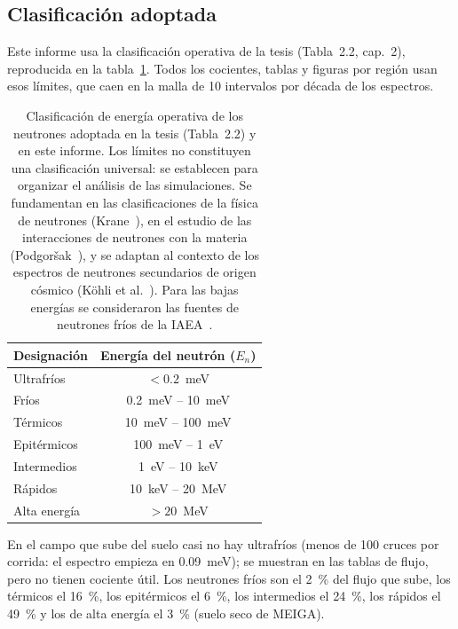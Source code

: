 \documentclass[11pt,a4paper]{article}
\begin{document}
\subsection{Clasificación adoptada}
Este informe usa la clasificación operativa de la tesis (Tabla~2.2, cap.~2), reproducida en la tabla~\ref{tab:clasif}.
Todos los cocientes, tablas y figuras por región usan esos límites, que caen en la malla de 10 intervalos por década de
los espectros.

\begin{table}[H]
	\centering\small
	\caption{Clasificación de energía operativa de los neutrones adoptada en la tesis (Tabla~2.2) y en este informe. Los
		límites no constituyen una clasificación universal: se establecen para organizar el análisis de las simulaciones. Se
		fundamentan en las clasificaciones de la física de neutrones (Krane~\cite[cap.~12, ``Neutron Physics'',
		pp.~444--477]{Krane1988}), en el estudio de las interacciones de neutrones con la materia
		(Podgoršak~\cite[cap.~9, ``Interactions of Neutrons with Matter'', pp.~429--449]{Podgorsak2010}), y se adaptan al
		contexto de los espectros de neutrones secundarios de origen cósmico (Köhli et al.~\cite[sec.~2.2, pp.~5774--5775,
		fig.~1]{Kohli2015}). Para las bajas energías se consideraron las fuentes de neutrones fríos de la
		IAEA~\cite{IAEA2023Cold}.}\label{tab:clasif}
\begin{tabular}{lc}
\toprule
Designación & Energía del neutrón ($E_n$) \\
\midrule
Ultrafríos & $<0.2$~meV \\
Fríos & 0.2~meV -- 10~meV \\
Térmicos & 10~meV -- 100~meV \\
Epitérmicos & 100~meV -- 1~eV \\
Intermedios & 1~eV -- 10~keV \\
Rápidos & 10~keV -- 20~MeV \\
Alta energía & $>20$~MeV \\
\bottomrule
\end{tabular}

\end{table}

En el campo que sube del suelo casi no hay ultrafríos (menos de 100 cruces por corrida: el espectro empieza en
0.09~meV); se muestran en las tablas de flujo, pero no tienen cociente útil. Los neutrones fríos son el 2~\% del flujo
que sube, los térmicos el 16~\%, los epitérmicos el 6~\%, los intermedios el 24~\%, los rápidos el 49~\% y los de alta
energía el 3~\% (suelo seco de MEIGA).
\end{document}
